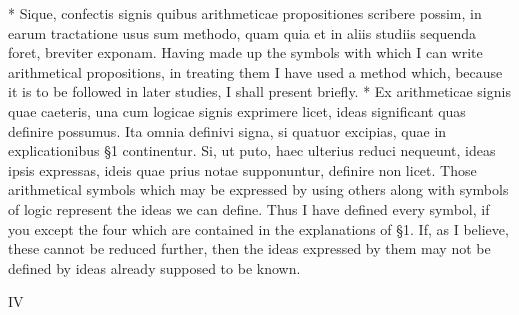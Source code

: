 \documentclass{book}
\newcommand{\s}{\switchcolumn} %
\newcommand{\peanoPage}[1]{\vspace{1ex}

  \columnratio{0.475, 0.05, 0.475} \begin{paracol}{3} \centering \hdashrule{\columnwidth}{0.1mm}{0.1mm 1mm} \s #1 \s \hdashrule{\columnwidth}{0.1mm}{0.1mm 1mm} \end{paracol}

\vspace{1ex}}
\newenvironment{translateTwoCol}
               { %
                 \columnratio{0.5, 0.5} \begin{paracol}{2}
                 \newcommand{\LAT}{\switchcolumn[0]*}
                 \newcommand{\ENG}{\switchcolumn[1]}
               }
               { %
                 \let\ENG\undefined
                 \let\LAT\undefined
                 \end{paracol}
               }
\begin{document}
\begin{translateTwoCol}
\LAT
Sique, confectis signis quibus arithmeticae propositiones scribere possim, in earum tractatione usus sum methodo, quam quia et in aliis studiis sequenda foret, breviter exponam.
\ENG Having made up the symbols with which I can write arithmetical propositions, in treating them I have used a method which, because it is to be followed in later studies, I shall present briefly.
\LAT
Ex arithmeticae signis quae caeteris, una cum logicae signis exprimere licet, ideas significant quas definire possumus. Ita omnia definivi signa, si quatuor excipias, quae in explicationibus \S 1 continentur. Si, ut puto, haec ulterius reduci nequeunt, ideas ipsis expressas, ideis quae prius notae supponuntur, definire non licet.
\ENG Those arithmetical symbols which may be expressed by using others along with symbols of logic represent the ideas we can define. Thus I have defined every symbol, if you except the four which are contained in the explanations of \S 1. If, as I believe, these cannot be reduced further, then the ideas expressed by them may not be defined by ideas already supposed to be known.
\end{translateTwoCol}

\peanoPage{IV} %
\end{document}
